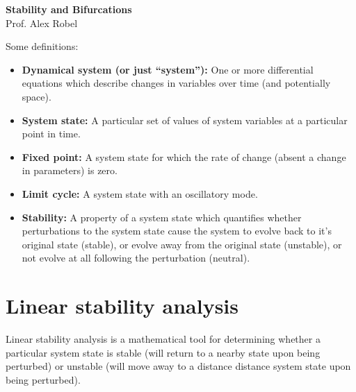 \documentclass[12pt]{article}
\theoremstyle{definition}
\begin{document}
\thispagestyle{empty}

\begin{center}
{\LARGE \bf Stability and Bifurcations}\\
{\large Prof. Alex Robel}\\
\end{center}

\begin{center}
\color{red}{For an accessible and supremely useful review of linear stability analysis, bifurcations and dynamical systems theory broadly, see ``Nonlinear Dynamics and Chaos'' by Strogatz. These ideas are not just useful in this class, but will help you see a range of scientific problems from a new perspective.}
\end{center}

Some definitions: \\
\begin{itemize}
\item \textbf{Dynamical system (or just ``system''):} One or more differential equations which describe changes in variables over time (and potentially space).
\item \textbf{System state:} A particular set of values of system variables at a particular point in time.
\item \textbf{Fixed point:} A system state for which the rate of change (absent a change in parameters) is zero.
\item \textbf{Limit cycle:} A system state with an oscillatory mode.
\item \textbf{Stability:} A property of a system state which quantifies whether perturbations to the system state cause the system to evolve back to it's original state (stable), or evolve away from the original state (unstable), or not evolve at all following the perturbation (neutral).
\end{itemize}

\section{Linear stability analysis}
Linear stability analysis is a mathematical tool for determining whether a particular system state is stable (will return to a nearby state upon being perturbed) or unstable (will move away to a distance distance system state upon being perturbed).
\end{document}

